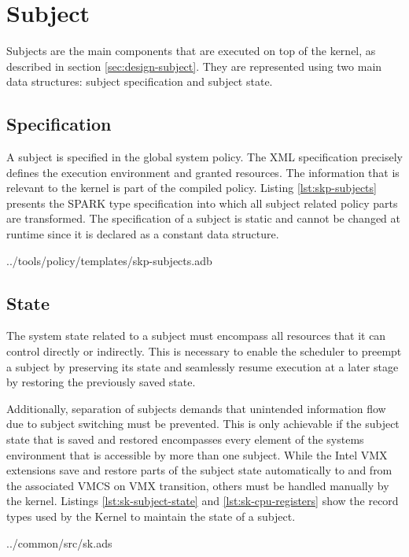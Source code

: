 \section{Subject}\label{sec:impl-subject}
Subjects are the main components that are executed on top of the kernel, as
described in section \ref{sec:design-subject}. They are represented using two
main data structures: subject specification and subject state.

\subsection{Specification}
A subject is specified in the global system policy. The XML specification
precisely defines the execution environment and granted resources. The
information that is relevant to the kernel is part of the compiled policy.
Listing \ref{lst:skp-subjects} presents the SPARK type specification into which
all subject related policy parts are transformed. The specification of a subject
is static and cannot be changed at runtime since it is declared as a constant
data structure.


	{../tools/policy/templates/skp-subjects.adb}

\subsection{State}
The system state related to a subject must encompass all resources that it can
control directly or indirectly. This is necessary to enable the scheduler to
preempt a subject by preserving its state and seamlessly resume execution at a
later stage by restoring the previously saved state.

Additionally, separation of subjects demands that unintended information flow
due to subject switching must be prevented. This is only achievable if the
subject state that is saved and restored encompasses every element of the
systems environment that is accessible by more than one subject. While the Intel
VMX extensions save and restore parts of the subject state automatically to and
from the associated VMCS on VMX transition, others must be handled manually by
the kernel. Listings \ref{lst:sk-subject-state} and \ref{lst:sk-cpu-registers}
show the record types used by the Kernel to maintain the state of a subject.


	{../common/src/sk.ads}

